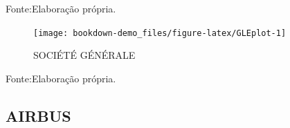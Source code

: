 \documentclass[
  12pt,
  a4paper,
  openany]{book}
\begin{document}
Fonte:Elaboração própria.

\justifying
\bigskip
\begin{figure}

{\centering \texttt{[image: bookdown-demo\_files/figure-latex/GLEplot-1]} 

}

\caption{SOCIÉTÉ GÉNÉRALE}\label{fig:GLEplot}
\end{figure}
\FloatBarrier
\centering

Fonte:Elaboração própria.

\justifying
\bigskip

\hypertarget{airbus}{%
\subsection{AIRBUS}\label{airbus}}
\end{document}

